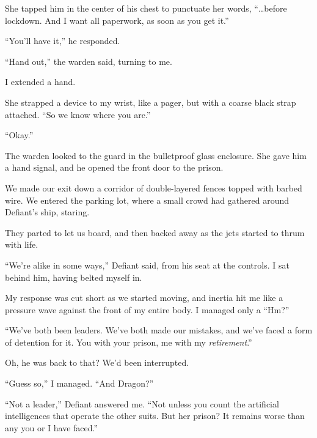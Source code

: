 She tapped him in the center of his chest to punctuate her words, ``\ldots{}before lockdown.  And I want all paperwork, as soon as you get it.''



``You'll have it,'' he responded.



``Hand out,'' the warden said, turning to me.



I extended a hand.



She strapped a device to my wrist, like a pager, but with a coarse black strap attached.  ``So we know where you are.''



``Okay.''



The warden looked to the guard in the bulletproof glass enclosure.  She gave him a hand signal, and he opened the front door to the prison.



We made our exit down a corridor of double-layered fences topped with barbed wire.  We entered the parking lot, where a small crowd had gathered around Defiant's ship, staring.



They parted to let us board, and then backed away as the jets started to thrum with life.



``We're alike in some ways,'' Defiant said, from his seat at the controls.  I sat behind him, having belted myself in.



My response was cut short as we started moving, and inertia hit me like a pressure  wave against the front of my entire body.  I managed only a ``Hm?''



``We've both been leaders.  We've both made our mistakes, and we've faced a form of detention for it.  You with your prison, me with my \emph{retirement}.''



Oh, he was back to that?  We'd been interrupted.



``Guess so,'' I managed.  ``And Dragon?''



``Not a leader,'' Defiant answered me.  ``Not unless you count the artificial intelligences that operate the other suits.  But her prison?  It remains worse than any you or I have faced.''



